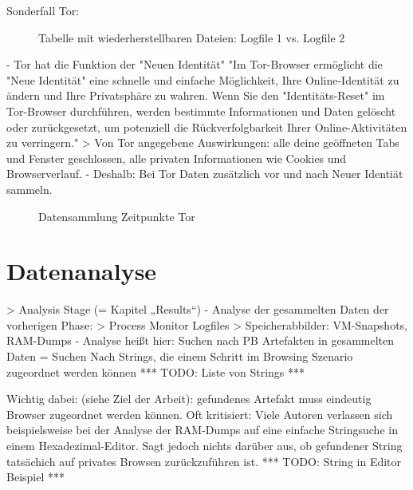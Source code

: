 	Sonderfall Tor:
		\begin{figure}[h!]
			\caption{Tabelle mit wiederherstellbaren Dateien: Logfile 1 vs. Logfile 2}
		\end{figure}
		- Tor hat die Funktion der "Neuen Identität" %
			"Im Tor-Browser ermöglicht die "Neue Identität" eine schnelle und einfache Möglichkeit, Ihre Online-Identität zu ändern und Ihre Privatsphäre zu wahren. Wenn Sie den "Identitäts-Reset" im Tor-Browser durchführen, werden bestimmte Informationen und Daten gelöscht oder zurückgesetzt, um potenziell die Rückverfolgbarkeit Ihrer Online-Aktivitäten zu verringern."
			> Von Tor angegebene Auswirkungen:  alle deine geöffneten Tabs und Fenster geschlossen, alle privaten Informationen wie Cookies und Browserverlauf.
		- Deshalb: Bei Tor Daten zusätzlich vor und nach Neuer Identiät sammeln.
		\begin{figure}[h!]
			\centering
			\small
			\centerline{\resizebox{\linewidth}{!}{}}
			\caption{Datensammlung Zeitpunkte Tor}
			\label{fig:jes}
		\end{figure}
	
	

\section{Datenanalyse}

> Analysis Stage (= Kapitel „Results“)
- Analyse der gesammelten Daten der vorherigen Phase: 
	> Process Monitor Logfiles	
	> Speicherabbilder: VM-Snapshots, RAM-Dumps
- Analyse heißt hier: Suchen nach PB Artefakten in gesammelten Daten
= Suchen Nach Strings, die einem Schritt im Browsing Szenario zugeordnet werden können
*** TODO: Liste von Strings ***

Wichtig dabei: (siehe Ziel der Arbeit): gefundenes Artefakt muss eindeutig Browser zugeordnet werden können.
Oft kritisiert: Viele Autoren verlassen sich beispielsweise bei der Analyse der RAM-Dumps auf eine einfache Stringsuche in einem Hexadezimal-Editor.
Sagt jedoch nichts darüber aus, ob gefundener String tatsächich auf privates Browsen zurückzuführen ist.
*** TODO: String in Editor Beispiel ***

